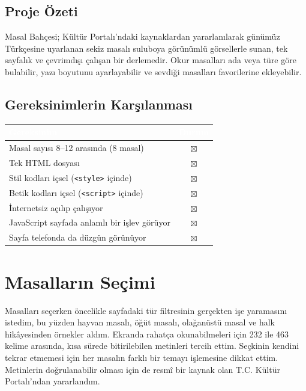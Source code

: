 \documentclass[12pt,a4paper]{article}
\begin{document}
\subsection{Proje Özeti}
Masal Bahçesi; Kültür Portalı'ndaki kaynaklardan yararlanılarak günümüz Türkçesine uyarlanan sekiz masalı suluboya görünümlü görsellerle sunan, tek sayfalık ve çevrimdışı çalışan bir derlemedir. Okur masalları ada veya türe göre bulabilir, yazı boyutunu ayarlayabilir ve sevdiği masalları favorilerine ekleyebilir.

\subsection{Gereksinimlerin Karşılanması}
\begin{center}
\begin{tabular}{@{}p{8.2cm}c@{}}
\toprule
\rowcolor{ana}\textcolor{white}{\textbf{Gereksinim}} & \textcolor{white}{\textbf{Durum}} \\
\midrule
Masal sayısı 8--12 arasında (8 masal)         & $\boxtimes$ \\
Tek HTML dosyası                                    & $\boxtimes$ \\
Stil kodları içsel (\texttt{<style>} içinde)        & $\boxtimes$ \\
Betik kodları içsel (\texttt{<script>} içinde)      & $\boxtimes$ \\
İnternetsiz açılıp çalışıyor                        & $\boxtimes$ \\
JavaScript sayfada anlamlı bir işlev görüyor        & $\boxtimes$ \\
Sayfa telefonda da düzgün görünüyor                 & $\boxtimes$ \\
\bottomrule
\end{tabular}
\end{center}
\section{Masalların Seçimi}
Masalları seçerken öncelikle sayfadaki tür filtresinin gerçekten işe yaramasını istedim, bu yüzden hayvan masalı, öğüt masalı, olağanüstü masal ve halk hikâyesinden örnekler aldım. Ekranda rahatça okunabilmeleri için 232 ile 463 kelime arasında, kısa sürede bitirilebilen metinleri tercih ettim. Seçkinin kendini tekrar etmemesi için her masalın farklı bir temayı işlemesine dikkat ettim. Metinlerin doğrulanabilir olması için de resmî bir kaynak olan T.C. Kültür Portalı'ndan yararlandım.
\end{document}
